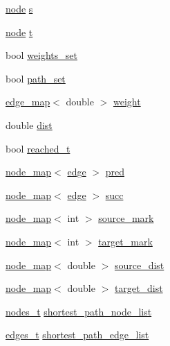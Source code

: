 \begin{DoxyCompactItemize}
\item 
\mbox{\hyperlink{classnode}{node}} \mbox{\hyperlink{classbid__dijkstra_a118e2ebd0d08ffc991c2bc578f8284a4}{s}}
\item 
\mbox{\hyperlink{classnode}{node}} \mbox{\hyperlink{classbid__dijkstra_a9370a71076d7807d1f3963e6dad9897e}{t}}
\item 
bool \mbox{\hyperlink{classbid__dijkstra_a7636f90a27d14c9eb4b115e8dad05464}{weights\+\_\+set}}
\item 
bool \mbox{\hyperlink{classbid__dijkstra_aa7b329f69600fffae2753f87501dab9d}{path\+\_\+set}}
\item 
\mbox{\hyperlink{classedge__map}{edge\+\_\+map}}$<$ double $>$ \mbox{\hyperlink{classbid__dijkstra_a477c4f7ce631df84c832cb7d517cd243}{weight}}
\item 
double \mbox{\hyperlink{classbid__dijkstra_a10224bf2b56cb3fe20cef83592ecdc13}{dist}}
\item 
bool \mbox{\hyperlink{classbid__dijkstra_a4714ec557ae9199e88e0242f9c6c2393}{reached\+\_\+t}}
\item 
\mbox{\hyperlink{classnode__map}{node\+\_\+map}}$<$ \mbox{\hyperlink{classedge}{edge}} $>$ \mbox{\hyperlink{classbid__dijkstra_a930f24f8d17953eccfa0e8765587b0ea}{pred}}
\item 
\mbox{\hyperlink{classnode__map}{node\+\_\+map}}$<$ \mbox{\hyperlink{classedge}{edge}} $>$ \mbox{\hyperlink{classbid__dijkstra_a7379d185faf9af3820b8292676f9d88a}{succ}}
\item 
\mbox{\hyperlink{classnode__map}{node\+\_\+map}}$<$ int $>$ \mbox{\hyperlink{classbid__dijkstra_a1b3684b69db38c8eaf9d4fbb056bc392}{source\+\_\+mark}}
\item 
\mbox{\hyperlink{classnode__map}{node\+\_\+map}}$<$ int $>$ \mbox{\hyperlink{classbid__dijkstra_a72bc13758ebe2f752cd15f018c5ba64e}{target\+\_\+mark}}
\item 
\mbox{\hyperlink{classnode__map}{node\+\_\+map}}$<$ double $>$ \mbox{\hyperlink{classbid__dijkstra_a19dc6c350617f0fa5769e5c70781d658}{source\+\_\+dist}}
\item 
\mbox{\hyperlink{classnode__map}{node\+\_\+map}}$<$ double $>$ \mbox{\hyperlink{classbid__dijkstra_a7a46fe8fe075d798eaca14b37aa15c0d}{target\+\_\+dist}}
\item 
\mbox{\hyperlink{edge_8h_a22ac17689106ba21a84e7bc54d1199d6}{nodes\+\_\+t}} \mbox{\hyperlink{classbid__dijkstra_a70041b0a90fb840e141126fe7a6119db}{shortest\+\_\+path\+\_\+node\+\_\+list}}
\item 
\mbox{\hyperlink{edge_8h_a8f9587479bda6cf612c103494b3858e3}{edges\+\_\+t}} \mbox{\hyperlink{classbid__dijkstra_a4b7bdbc4d016748b40ca925cf1e6f778}{shortest\+\_\+path\+\_\+edge\+\_\+list}}
\end{DoxyCompactItemize}



